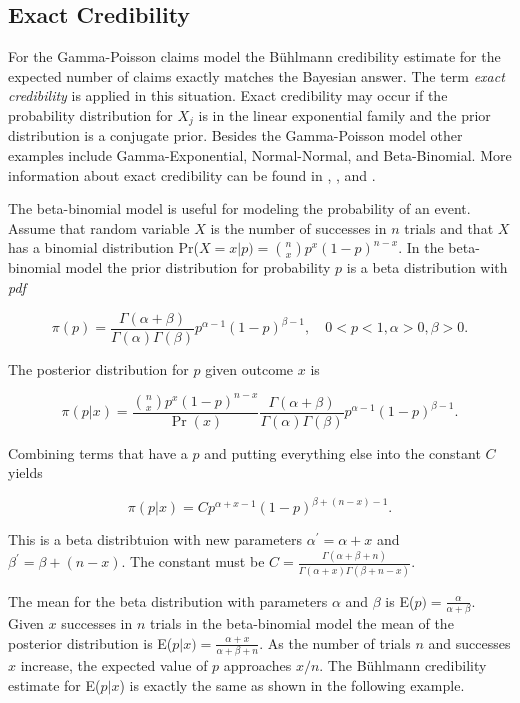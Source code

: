 \documentclass[]{book}
\theoremstyle{definition}
\theoremstyle{definition}
\theoremstyle{definition}
\theoremstyle{remark}
\begin{document}
\subsection{Exact Credibility}\label{exact-credibility}

For the Gamma-Poisson claims model the Bühlmann credibility estimate for
the expected number of claims exactly matches the Bayesian answer. The
term \emph{exact credibility} is applied in this situation. Exact
credibility may occur if the probability distribution for \(X_j\) is in
the linear exponential family and the prior distribution is a conjugate
prior. Besides the Gamma-Poisson model other examples include
Gamma-Exponential, Normal-Normal, and Beta-Binomial. More information
about exact credibility can be found in \citep{buhlmanngisler},
\citep{klugman2012}, and \citep{tse}.

The beta-binomial model is useful for modeling the probability of an
event. Assume that random variable \(X\) is the number of successes in
\(n\) trials and that \(X\) has a binomial distribution
Pr(\(X=x|p)=\binom{n}{x}p^x(1-p)^{n-x}\). In the beta-binomial model the
prior distribution for probability \(p\) is a beta distribution with
\emph{pdf}

\begin{equation*}  
\pi(p)=\frac{\Gamma(\alpha+\beta)}{\Gamma(\alpha)\Gamma(\beta)}p^{\alpha-1}(1-p)^{\beta-1} , \quad  0<p<1, \alpha>0, \beta>0.
\end{equation*}

The posterior distribution for \(p\) given outcome \(x\) is

\begin{equation*} 
\pi(p|x)=\frac{\binom{n}{x}p^x(1-p)^{n-x}}{\Pr(x)}\frac{\Gamma(\alpha+\beta)}{\Gamma(\alpha)\Gamma(\beta)}p^{\alpha-1}(1-p)^{\beta-1}.
\end{equation*}

Combining terms that have a \(p\) and putting everything else into the
constant \(C\) yields

\begin{equation*} 
\pi(p| x)=Cp^{\alpha+x-1}(1-p)^{\beta+(n-x)-1}.
\end{equation*}

This is a beta distribtuion with new parameters
\(\alpha^\prime=\alpha+x\) and \(\beta^\prime=\beta+(n-x)\). The
constant must be
\(C=\frac{\Gamma(\alpha+\beta+n)}{\Gamma(\alpha+x)\Gamma(\beta+n-x)}\).

The mean for the beta distribution with parameters \(\alpha\) and
\(\beta\) is E(\(p)=\frac{\alpha}{\alpha+\beta}\). Given \(x\) successes
in \(n\) trials in the beta-binomial model the mean of the posterior
distribution is E(\(p|x)=\frac{\alpha+x}{\alpha+\beta+n}\). As the
number of trials \(n\) and successes \(x\) increase, the expected value
of \(p\) approaches \(x/n\). The Bühlmann credibility estimate for
E(\(p|x\)) is exactly the same as shown in the following example.
\end{document}
